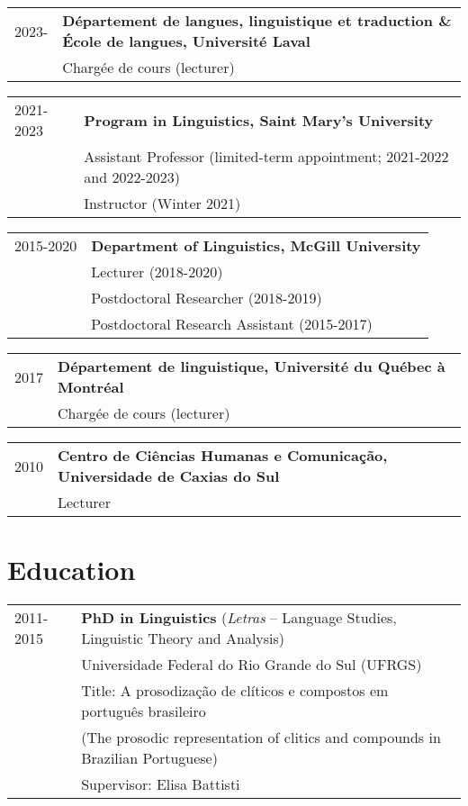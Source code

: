 \documentclass[letterpaper,10pt]{article}
\begin{document}
\begin{tabular}{p{1.6cm}p{15.4cm}}
2023-  & \textbf{D\'epartement de langues, linguistique et traduction \& \'Ecole de langues, Universit\'e Laval}\\
& Charg\'ee de cours (lecturer)
\end{tabular}

\begin{tabular}{p{1.6cm}p{14.4cm}}
2021-2023  & \textbf{Program in Linguistics, Saint Mary's University}\\
& Assistant Professor (limited-term appointment; 2021-2022 and 2022-2023)\\
& Instructor (Winter 2021)		 
\end{tabular}

\begin{tabular}{p{1.6cm}p{14.4cm}}
2015-2020  & \textbf{Department of Linguistics, McGill University}\\
& Lecturer (2018-2020)\\
		& Postdoctoral Researcher (2018-2019)\\
		& Postdoctoral Research Assistant (2015-2017) 
\end{tabular}

\begin{tabular}{p{1.6cm}p{14.4cm}}
2017     & \textbf{D\'epartement de linguistique, Universit\'e du Qu\'ebec \`{a} Montr\'eal}\\
		& Charg\'ee de cours (lecturer)           
\end{tabular}

\begin{tabular}{p{1.6cm}p{14.4cm}}
2010            & \textbf{Centro de Ci\^encias Humanas e Comunica\c{c}\~ao, Universidade de Caxias do Sul}\\
& Lecturer               
\end{tabular}

\vspace{0.3cm}

\section{Education}
\begin{tabular}{p{1.6cm}p{14.6cm}}	
 2011-2015 & \textbf{PhD in Linguistics} (\emph{Letras} -- Language Studies, Linguistic Theory and Analysis)\\
    &   Universidade Federal do Rio Grande do Sul (UFRGS)\\
    &   Title: A prosodiza\c{c}\~ao de cl\'iticos e compostos em portugu\^es brasileiro\\
    &   (The prosodic representation of clitics and compounds in Brazilian Portuguese)\\ %
    &   Supervisor: Elisa Battisti
    \end{tabular}
\end{document}
